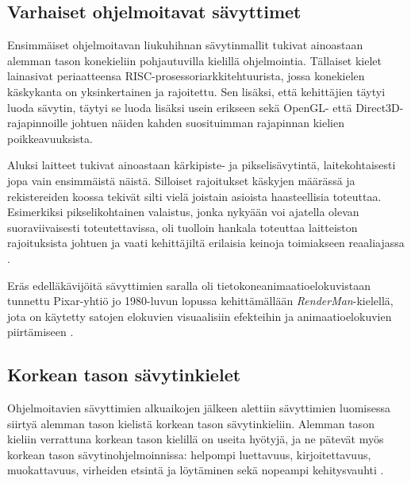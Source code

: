 \documentclass[finnish]{tktltiki2}
\theoremstyle{definition}
\theoremstyle{remark}
\begin{document}
\subsection{Varhaiset ohjelmoitavat sävyttimet}

Ensimmäiset ohjelmoitavan liukuhihnan sävytinmallit tukivat ainoastaan alemman tason konekieliin pohjautuvilla kielillä ohjelmointia. Tällaiset kielet lainasivat periaatteensa RISC-prosessoriarkkitehtuurista, jossa konekielen käskykanta on yksinkertainen ja rajoitettu. Sen lisäksi, että kehittäjien täytyi luoda sävytin, täytyi se luoda lisäksi usein erikseen sekä OpenGL- että Direct3D-rajapinnoille johtuen näiden kahden suosituimman rajapinnan kielien poikkeavuuksista. 

Aluksi laitteet tukivat ainoastaan kärkipiste- ja pikselisävytintä, laitekohtaisesti jopa vain ensimmäistä näistä. Silloiset rajoitukset käskyjen määrässä ja rekistereiden koossa tekivät silti vielä joistain asioista haasteellisia toteuttaa. Esimerkiksi pikselikohtainen valaistus, jonka nykyään voi ajatella olevan suoraviivaisesti toteutettavissa, oli tuolloin hankala toteuttaa laitteiston rajoituksista johtuen ja vaati kehittäjiltä erilaisia keinoja toimiakseen reaaliajassa \cite[s. 174-176]{She08}.

Eräs edelläkävijöitä sävyttimien saralla oli tietokoneanimaatioelokuvistaan tunnettu Pixar-yhtiö jo 1980-luvun lopussa kehittämällään \emph{RenderMan}-kielellä, jota on käytetty satojen elokuvien visuaalisiin efekteihin ja animaatioelokuvien piirtämiseen \cite{Pix15}.

\subsection{Korkean tason sävytinkielet}

Ohjelmoitavien sävyttimien alkuaikojen jälkeen alettiin sävyttimien luomisessa siirtyä alemman tason kielistä korkean tason sävytinkieliin. Alemman tason kieliin verrattuna korkean tason kielillä on useita hyötyjä, ja ne pätevät myös korkean tason sävytinohjelmoinnissa: helpompi luettavuus, kirjoitettavuus, muokattavuus, virheiden etsintä ja löytäminen sekä nopeampi kehitysvauhti \cite[s.183-185]{She08}. 
\end{document}
